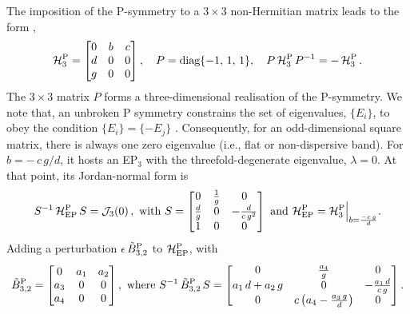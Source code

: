 \documentclass[aps, prb, onecolumn, nofootinbib, citeautoscript, 10pt]{revtex4-2}
\begin{document}
The imposition of the P-symmetry to a $3\times 3$ non-Hermitian matrix leads to the form \cite{ips-emil},
\begin{align}
\mathcal H^{\rm P}_3 = \begin{bmatrix}
0 & b & c \\
 d & 0 & 0 \\
 g & 0 & 0 \\
\end{bmatrix}, \quad
P = \text{diag}\lbrace -1,\,1,\,1 \rbrace ,\quad
P\,\mathcal H^{\rm P}_3\, P^{-1} = - \, \mathcal H^{\rm P}_3 \,.
\end{align}
The $3\times 3$ matrix $P$ forms a three-dimensional realisation of the P-symmetry. We note that, an unbroken P symmetry constrains the set of eigenvalues, $ \lbrace E_i \rbrace$, to obey the condition $\lbrace E_i \rbrace = \lbrace - E_j \rbrace $ \cite{emil_nh_nodal}.
Consequently, for an odd-dimensional square matrix, there is always one zero eigenvalue (i.e., flat or non-dispersive band). For $b = -\,{c\, g} / {d}$, it hosts an EP$_3$ with the threefold-degenerate eigenvalue, $\lambda = 0$. At that point, its Jordan-normal form is
\begin{align}
S^{-1} \, {\mathcal H^{\rm P}_{\rm EP}} \, S = \mathcal J_3(0)\,, \text{ with }
S = \begin{bmatrix}
 0 & \frac{1}{g} & 0 \\
 \frac{d}{g} & 0 & -\frac{d}{c \,g^2} \\
 1 & 0 & 0 \\
\end{bmatrix} 
\text{ and }
{\mathcal H^{\rm P}_{\rm EP}}  = {\mathcal H^{\rm P}_3} \Big \vert_{b =\frac{- c\, g}  {d}}.
\end{align}
Adding a perturbation $\epsilon\, \tilde B^{\rm P}_{3,2}$ to ${\mathcal H^{\rm P}_{\rm EP}}$, with
\begin{align}
\tilde B^{\rm P}_{3,2} = \begin{bmatrix}
0 & a_1 & a_2 \\
 a_3 & 0 & 0 \\
 a_4 & 0 & 0 \\
\end{bmatrix},  
\text{ where }
S^{-1}\, \tilde B^{\rm P}_{3,2}\, S = \begin{bmatrix}
 0 & \frac{a_4}{g} & 0 \\
 a_1\, d+a_2\, g & 0 & -\frac{a_1 \,d}{c\, g} \\
 0 & c \left(a_4-\frac{a_3 \,g}{d}\right) & 0 \\
 \end{bmatrix} .
\end{align}
\end{document}

